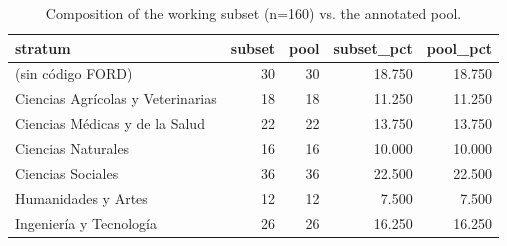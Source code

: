 \begin{table}
\caption{Composition of the working subset (n=160) vs. the annotated pool.}
\label{tab:subset}
\begin{tabular}{lrrrr}
\toprule
stratum & subset & pool & subset\_pct & pool\_pct \\
\midrule
(sin código FORD) & 30 & 30 & 18.750 & 18.750 \\
Ciencias Agrícolas y Veterinarias & 18 & 18 & 11.250 & 11.250 \\
Ciencias Médicas y de la Salud & 22 & 22 & 13.750 & 13.750 \\
Ciencias Naturales & 16 & 16 & 10.000 & 10.000 \\
Ciencias Sociales & 36 & 36 & 22.500 & 22.500 \\
Humanidades y Artes & 12 & 12 & 7.500 & 7.500 \\
Ingeniería y Tecnología & 26 & 26 & 16.250 & 16.250 \\
\bottomrule
\end{tabular}
\end{table}

